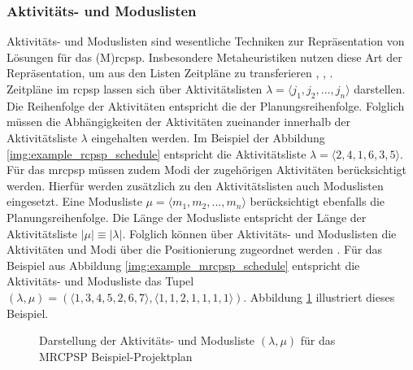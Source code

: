 \subsubsection{Aktivitäts- und Moduslisten} \label{subsec:SGS_Darstellung}  
Aktivitäts- und Moduslisten sind wesentliche Techniken zur Repräsentation von Lösungen für das (M)\ac{rcpsp}. Insbesondere Metaheuristiken nutzen diese Art der Repräsentation, um aus den Listen Zeitpläne zu transferieren \cite[vgl.][S. 10]{rezaeian_using_2015}, \cite[vgl.][S. 602]{wuliang_improved_2014}, \cite[vgl.][S. 2370]{li_solving_2013}. \\

Zeitpläne im \ac{rcpsp} lassen sich über Aktivitätslisten  $\lambda = \langle j_1, j_2, ..., j_n \rangle$ darstellen. Die Reihenfolge der Aktivitäten entspricht die der Planungsreihenfolge. Folglich müssen die Abhängigkeiten der Aktivitäten zueinander innerhalb der Aktivitätsliste $\lambda$ eingehalten werden. Im Beispiel der Abbildung \ref{img:example_rcpsp_schedule} entspricht die Aktivitätsliste $\lambda = \langle 2, 4, 1, 6, 3, 5 \rangle$. \cite[vgl.][S. 3 f.]{kolisch_heuristic_1998} \\

Für das \ac{mrcpsp} müssen zudem Modi der zugehörigen Aktivitäten berücksichtigt werden. Hierfür werden zusätzlich zu den Aktivitätslisten auch Moduslisten eingesetzt. Eine Modusliste $\mu = \langle m_1, m_2, ..., m_n \rangle$ berücksichtigt ebenfalls die Planungsreihenfolge. Die Länge der Modusliste entspricht der Länge der Aktivitätsliste $|\mu| \equiv |\lambda|$. Folglich können über Aktivitäts- und Moduslisten die Aktivitäten und Modi über die Positionierung zugeordnet werden \cite[vgl.][S. 908]{sebt_efficient_2015}. Für das Beispiel aus Abbildung \ref{img:example_mrcpsp_schedule} entspricht die Aktivitäts- und Modusliste das Tupel $(\lambda, \mu) = (\langle 1, 3, 4, 5, 2, 6, 7 \rangle, \langle 1, 1, 2, 1, 1, 1, 1 \rangle)$. Abbildung \ref{img:ActivityModeListExample} illustriert dieses Beispiel. \\

\begin{figure}[H]
    \centering
    \noindent{}
    \caption{Darstellung der Aktivitäts- und Modusliste $(\lambda, \mu)$ für das MRCPSP Beispiel-Projektplan} 
    \label{img:ActivityModeListExample}
\end{figure}

